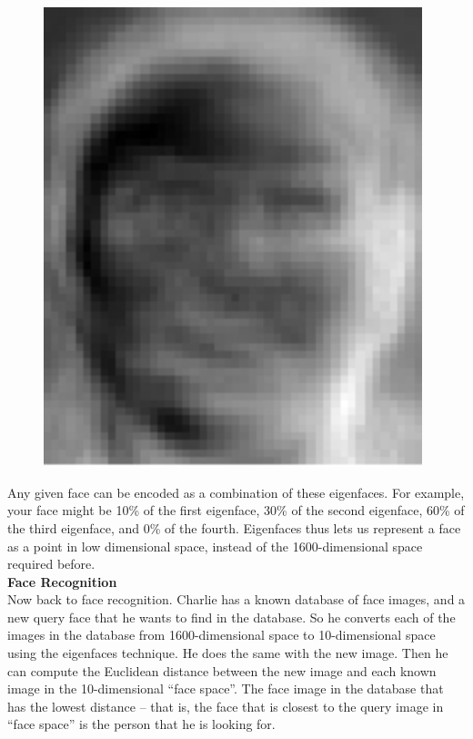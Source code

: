 \begin{figure}[H]
\begin{minipage}[b]{0.2\textwidth}
	  \end{minipage}
	  \hspace{0.2cm}
	   \begin{minipage}[b]{0.2\textwidth}
	    \includegraphics[width=0.98\textwidth]{season3/304/images/eigenface4.jpg}
	  \end{minipage}
	  \end{figure}
Any given face can be encoded as a combination of these eigenfaces. For example, your face might be 10\% of the first eigenface, 30\% of the second eigenface, 60\% of the third eigenface, and 0\% of the fourth. Eigenfaces thus lets us represent a face as a point in low dimensional space, instead of the 1600-dimensional space required before. \\[1cm]


\noindent\textbf{\large Face Recognition} \\

Now back to face recognition. Charlie has a known database of face images, and a new query face that he wants to find in the database. So he converts each of the images in the database from 1600-dimensional space to 10-dimensional space using the eigenfaces technique. He does the same with the new image. Then he can compute the Euclidean distance between the new image and each known image in the 10-dimensional ``face space''. The face image in the database that has the lowest distance -- that is, the face that is closest to the query image in ``face space'' is the person that he is looking for. \\

